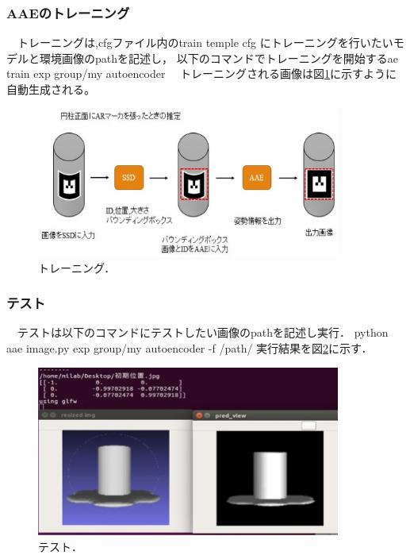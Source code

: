 \documentclass[11pt,a4j,ascmac]{jsarticle}
\begin{document}
\subsubsection{AAEのトレーニング}
　トレーニングは,cfgファイル内のtrain temple cfg
にトレーニングを行いたいモデルと環境画像のpathを記述し，
以下のコマンドでトレーニングを開始するae train exp group/my autoencoder　
トレーニングされる画像は図\ref{style3}に示すように自動生成される。

      \begin{figure}[htpp]
      \centering
      \includegraphics[width=100mm]{2.eps}
      \vspace*{25mm}
      \caption{トレーニング．}
      \label{style3}
      \end{figure}



\subsubsection{テスト}
　テストは以下のコマンドにテストしたい画像のpathを記述し実行．
python aae image.py exp group/my autoencoder -f /path/
実行結果を図\ref{style4}に示す．

     \begin{figure}[htpp]
     \centering
     \includegraphics[width=100mm]{3.eps}
     \vspace*{25mm}
     \caption{テスト．}
     \label{style4}
     \end{figure}
\end{document}
